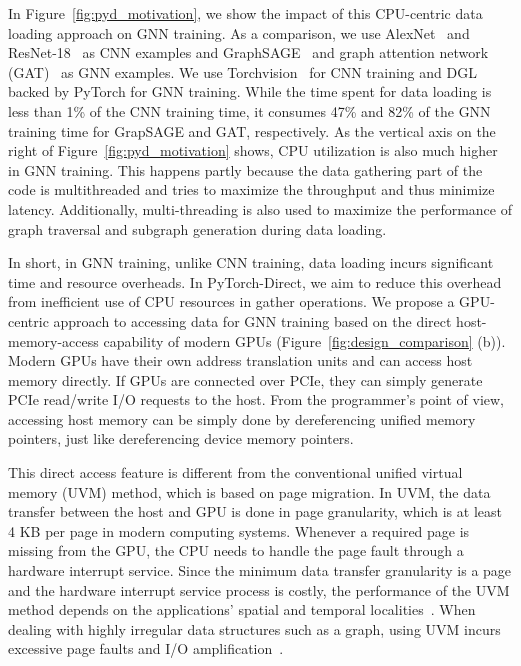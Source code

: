 In Figure~\ref{fig:pyd_motivation}, we show the impact of this CPU-centric data loading approach on GNN training.
As a comparison, we use AlexNet~\cite{krizhevsky2012imagenet} and ResNet-18~\cite{He2015} as CNN examples and GraphSAGE~\cite{hamilton2017inductive} and graph attention network (GAT)~\cite{attention2018graph} as GNN examples.
We use Torchvision~\cite{torchvision} for CNN training and DGL backed by PyTorch for GNN training.
While the time spent for data loading is less than 1\% of the CNN training time, it consumes 47\% and 82\% of the GNN training time for GrapSAGE and GAT, respectively.
As the vertical axis on the right of Figure~\ref{fig:pyd_motivation} shows, CPU utilization is also much higher in GNN training.
This happens partly because the data gathering part of the code is multithreaded and tries to maximize the throughput and thus minimize latency.
Additionally, multi-threading is also used to maximize the performance of graph traversal and subgraph generation during data loading.


In short, in GNN training, unlike CNN training, data loading incurs significant time and resource overheads. In PyTorch-Direct, we aim to reduce this overhead from inefficient use of CPU resources in gather operations.
We propose a GPU-centric approach to accessing data for GNN training based on the direct host-memory-access capability of modern GPUs (Figure~\ref{fig:design_comparison} (b)).
Modern GPUs have their own address translation units and can access host memory directly.
If GPUs are connected over PCIe, they can simply generate PCIe read/write I/O
requests to the host.
From the programmer's point of view, accessing host memory can be simply done by dereferencing unified memory pointers, just like dereferencing device memory pointers.

This direct access feature is different from the conventional unified virtual memory (UVM) method, which is based on page migration.
In UVM, the data transfer between the host and GPU is done in page granularity, which is at least 4 KB per page in modern computing systems.
Whenever a required page is missing from the GPU, the CPU needs to handle the page fault through a hardware interrupt service.
Since the minimum data transfer granularity is a page and the hardware interrupt service process is costly, the performance of the UVM method depends on the applications' spatial and temporal localities~\cite{uvmguide}.
When dealing with highly irregular data structures such as a graph, using UVM incurs excessive page faults and I/O amplification~\cite{10.14778/3384345.3384358,minEMOGIEfficientMemoryaccess2020,10.1145/3342195.3387537}.

